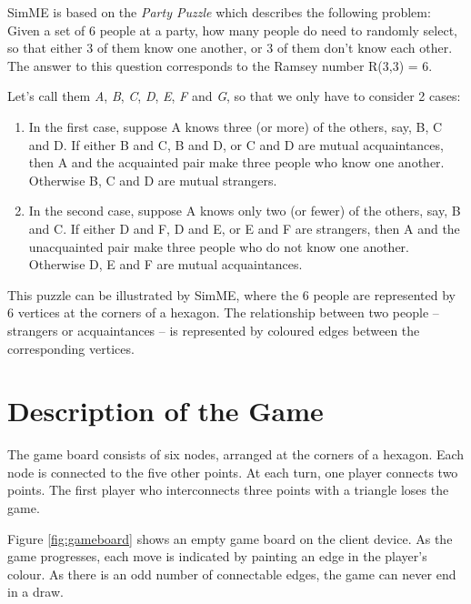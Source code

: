 	SimME is based on the \emph{Party Puzzle} which describes the following
	problem: Given a set of 6 people at a party, how many people do need to
	randomly select, so that either 3 of them know one another, or 3 of them
	don't know each other. The answer to this question corresponds to the Ramsey
	number R(3,3) = 6.

	Let's call them \emph{A}, \emph{B}, \emph{C}, \emph{D}, \emph{E}, \emph{F}
	and \emph{G}, so that we only have to consider 2 cases:

	\begin{enumerate}

		\item In the first case, suppose A knows three (or more) of the
		others, say, B, C and D. If either B and C, B and D, or C and D are
		mutual acquaintances, then A and the acquainted pair make three
		people who know one another. Otherwise B, C and D are mutual
		strangers.

		\item In the second case, suppose A knows only two (or fewer) of the
		others, say, B and C. If either D and F, D and E, or E and F are
		strangers, then A and the unacquainted pair make three people who do
		not know one another. Otherwise D, E and F are mutual acquaintances.

	\end{enumerate}

	This puzzle can be illustrated by SimME, where the 6 people are represented
	by 6 vertices at the corners of a hexagon. The relationship between two
	people -- strangers or acquaintances -- is represented by coloured edges
	between the corresponding vertices.


\section{Description of the Game}

	The game board consists of six nodes, arranged at the corners of a hexagon.
	Each node is connected to the five other points. At each turn, one player
	connects two points. The first player who interconnects three points with a
	triangle loses the game.

	Figure \ref{fig:gameboard} shows an empty game board on the client device.
	As the game progresses, each move is indicated by painting an edge in the
	player's colour. As there is an odd number of connectable edges, the game
	can never end in a draw.

